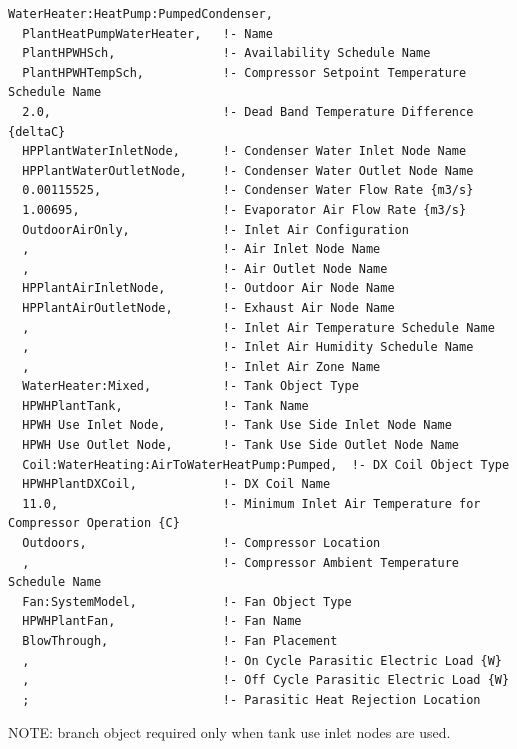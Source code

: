 \begin{lstlisting}
WaterHeater:HeatPump:PumpedCondenser,
  PlantHeatPumpWaterHeater,   !- Name
  PlantHPWHSch,               !- Availability Schedule Name
  PlantHPWHTempSch,           !- Compressor Setpoint Temperature Schedule Name
  2.0,                        !- Dead Band Temperature Difference {deltaC}
  HPPlantWaterInletNode,      !- Condenser Water Inlet Node Name
  HPPlantWaterOutletNode,     !- Condenser Water Outlet Node Name
  0.00115525,                 !- Condenser Water Flow Rate {m3/s}
  1.00695,                    !- Evaporator Air Flow Rate {m3/s}
  OutdoorAirOnly,             !- Inlet Air Configuration
  ,                           !- Air Inlet Node Name
  ,                           !- Air Outlet Node Name
  HPPlantAirInletNode,        !- Outdoor Air Node Name
  HPPlantAirOutletNode,       !- Exhaust Air Node Name
  ,                           !- Inlet Air Temperature Schedule Name
  ,                           !- Inlet Air Humidity Schedule Name
  ,                           !- Inlet Air Zone Name
  WaterHeater:Mixed,          !- Tank Object Type
  HPWHPlantTank,              !- Tank Name
  HPWH Use Inlet Node,        !- Tank Use Side Inlet Node Name
  HPWH Use Outlet Node,       !- Tank Use Side Outlet Node Name
  Coil:WaterHeating:AirToWaterHeatPump:Pumped,  !- DX Coil Object Type
  HPWHPlantDXCoil,            !- DX Coil Name
  11.0,                       !- Minimum Inlet Air Temperature for Compressor Operation {C}
  Outdoors,                   !- Compressor Location
  ,                           !- Compressor Ambient Temperature Schedule Name
  Fan:SystemModel,            !- Fan Object Type
  HPWHPlantFan,               !- Fan Name
  BlowThrough,                !- Fan Placement
  ,                           !- On Cycle Parasitic Electric Load {W}
  ,                           !- Off Cycle Parasitic Electric Load {W}
  ;                           !- Parasitic Heat Rejection Location
\end{lstlisting}

NOTE: branch object required only when tank use inlet nodes are used.

